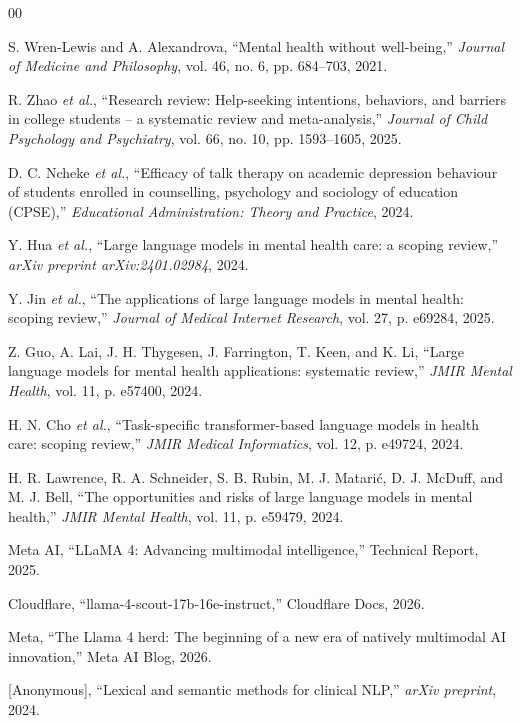 \documentclass[sigconf]{acmart}
\begin{document}
\begin{thebibliography}{00}

 S. Wren-Lewis and A. Alexandrova, ``Mental health without well-being,'' \textit{Journal of Medicine and Philosophy}, vol. 46, no. 6, pp. 684--703, 2021.

 R. Zhao \textit{et al.}, ``Research review: Help-seeking intentions, behaviors, and barriers in college students -- a systematic review and meta-analysis,'' \textit{Journal of Child Psychology and Psychiatry}, vol. 66, no. 10, pp. 1593--1605, 2025.

 D. C. Ncheke \textit{et al.}, ``Efficacy of talk therapy on academic depression behaviour of students enrolled in counselling, psychology and sociology of education (CPSE),'' \textit{Educational Administration: Theory and Practice}, 2024.

 Y. Hua \textit{et al.}, ``Large language models in mental health care: a scoping review,'' \textit{arXiv preprint arXiv:2401.02984}, 2024.

 Y. Jin \textit{et al.}, ``The applications of large language models in mental health: scoping review,'' \textit{Journal of Medical Internet Research}, vol. 27, p. e69284, 2025.

 Z. Guo, A. Lai, J. H. Thygesen, J. Farrington, T. Keen, and K. Li, ``Large language models for mental health applications: systematic review,'' \textit{JMIR Mental Health}, vol. 11, p. e57400, 2024.

 H. N. Cho \textit{et al.}, ``Task-specific transformer-based language models in health care: scoping review,'' \textit{JMIR Medical Informatics}, vol. 12, p. e49724, 2024.

 H. R. Lawrence, R. A. Schneider, S. B. Rubin, M. J. Matarić, D. J. McDuff, and M. J. Bell, ``The opportunities and risks of large language models in mental health,'' \textit{JMIR Mental Health}, vol. 11, p. e59479, 2024.

 Meta AI, ``LLaMA 4: Advancing multimodal intelligence,'' Technical Report, 2025.

 Cloudflare, ``llama-4-scout-17b-16e-instruct,'' Cloudflare Docs, 2026.

 Meta, ``The Llama 4 herd: The beginning of a new era of natively multimodal AI innovation,'' Meta AI Blog, 2026.

 [Anonymous], ``Lexical and semantic methods for clinical NLP,'' \textit{arXiv preprint}, 2024.


\end{thebibliography}
\end{document}
